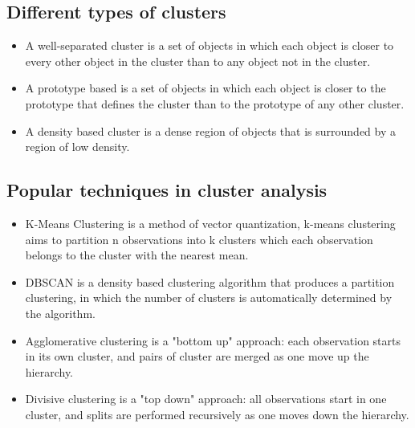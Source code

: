 \documentclass[12pt]{article}
\begin{document}
\subsection{Different types of clusters}
\begin{itemize}
\item A well-separated cluster is a set of objects in which each object is closer to every other object in the cluster than to any object not in the cluster. 
\item A prototype based is a set of objects in which each object is closer to the prototype that defines the cluster than to the prototype of any other cluster.
\item A density based cluster is a dense region of objects that is surrounded by a region of low density. 
\end{itemize}

\subsection{Popular techniques in cluster analysis}
\begin{itemize}
\item K-Means Clustering is a method of vector quantization, k-means clustering aims to partition n observations into k clusters which each observation belongs to the cluster with the nearest mean.
\item DBSCAN is a density based clustering algorithm that produces a partition clustering, in which the number of clusters is automatically determined by the algorithm. 
\item Agglomerative clustering is a "bottom up" approach: each observation starts in its own cluster, and pairs of cluster are merged as one move up the hierarchy.
\item Divisive clustering is a "top down" approach: all observations start in one cluster, and splits are performed recursively as one moves down the hierarchy.
\end{itemize}

\newpage
\end{document}
